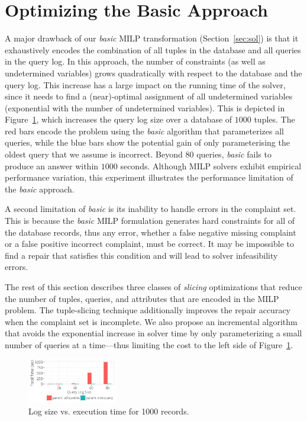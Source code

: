 
\section{Optimizing the Basic Approach}
\label{sec:opt}

A major drawback of our \emph{basic} MILP transformation (Section~\ref{sec:sol}) is
that it exhaustively encodes the combination of all tuples in the database and all queries
in the query log.  In this approach, the number of constraints (as well as undetermined variables) 
grows quadratically with respect to the database and the query log.
This increase has a large impact on the running time of the solver, since it needs to find a (near)-optimal 
assignment of all undetermined variables (exponential with the number of undetermined variables).
This is depicted in Figure~\ref{fig:querysize_vs_time}, which increases the query log size over a database of $1000$ tuples.  
The red bars encode the problem using  the \emph{basic} algorithm that parameterizes all queries, while the blue bars show the potential gain of only parameterising the oldest query that we assume is incorrect.
Beyond $80$ queries, \emph{basic} fails to produce an answer within $1000$ seconds.
Although MILP solvers exhibit empirical performance variation,
this experiment illustrates the performance limitation of the \emph{basic} approach. 

A second limitation of \emph{basic} is its inability to handle errors in the complaint set.
This is because the \emph{basic} MILP formulation generates hard constraints for all of the database records, thus any error, whether a false negative missing complaint or a false positive incorrect complaint, must be correct.
It may be impossible to find a repair that satisfies this condition and will lead to solver infeasibility errors.


The rest of this section describes three classes of \emph{slicing} optimizations that 
reduce the number of tuples, queries, and attributes that are encoded in the MILP problem. 
The tuple-slicing technique additionally improves the repair accuracy when the complaint set is incomplete. 
We also propose an incremental algorithm that avoids the exponential increase in solver time by only parameterizing a small number of queries at a time---thus limiting
the cost to the left side of Figure~\ref{fig:querysize_vs_time}.







\begin{figure}[t]
    \centering
    \includegraphics[width=0.35\textwidth]{figures/qsize_time_badscale}
    \vspace*{-0.1in}
    \caption{Log size vs. execution time for 1000 records. }
    \label{fig:querysize_vs_time}
\end{figure}

